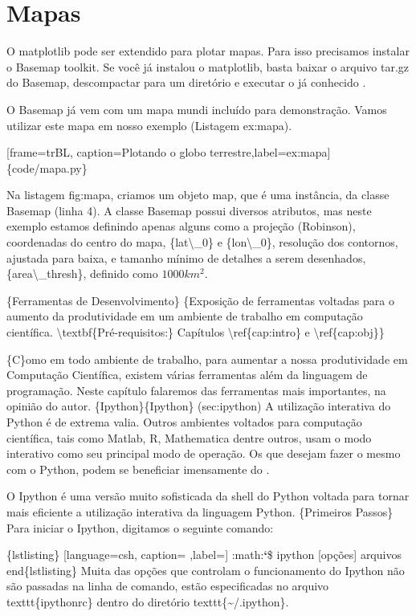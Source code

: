 \documentclass[a4paper,10pt,portuguese]{sphinxmanual}
\begin{document}
\section{Mapas}
\label{Capplot:mapas}
O matplotlib pode ser extendido para plotar mapas. Para isso
precisamos instalar o Basemap toolkit. Se você já instalou o
matplotlib, basta baixar o arquivo tar.gz do Basemap, descompactar
para um diretório e executar o já conhecido
.

O Basemap já vem com um mapa mundi incluído para demonstração.
Vamos utilizar este mapa em nosso exemplo (Listagem ex:mapa).

{[}frame=trBL, caption=Plotando o globo terrestre,label=ex:mapa{]} \{code/mapa.py\}

Na listagem fig:mapa, criamos um objeto map, que é uma instância,
da classe Basemap (linha 4). A classe Basemap possui diversos
atributos, mas neste exemplo estamos definindo apenas alguns como a
projeção (Robinson), coordenadas do centro do mapa, \{lat\textbackslash{}\_0\} e
\{lon\textbackslash{}\_0\}, resolução dos contornos, ajustada para baixa, e tamanho
mínimo de detalhes a serem desenhados, \{area\textbackslash{}\_thresh\}, definido
como $1000 km^2$.

\{Ferramentas de Desenvolvimento\}
\{Exposição de ferramentas voltadas para o aumento da produtividade em um ambiente de trabalho em computação científica. \textbackslash{}textbf\{Pré-requisitos:\} Capítulos \textbackslash{}ref\{cap:intro\} e \textbackslash{}ref\{cap:obj\}\}

\{C\}omo em todo ambiente de trabalho, para aumentar a nossa
produtividade em Computação Científica, existem várias ferramentas
além da linguagem de programação. Neste capítulo falaremos das
ferramentas mais importantes, na opinião do autor.
\{Ipython\}\{Ipython\} (sec:ipython) A utilização interativa do Python
é de extrema valia. Outros ambientes voltados para computação
científica, tais como Matlab, R, Mathematica dentre outros, usam o
modo interativo como seu principal modo de operação. Os que desejam
fazer o mesmo com o Python, podem se beneficiar imensamente do
.

O Ipython é uma versão muito sofisticada da shell do Python voltada
para tornar mais eficiente a utilização interativa da linguagem
Python. \{Primeiros Passos\} Para iniciar o Ipython, digitamos o
seguinte comando:

\{lstlisting\} {[}language=csh, caption= ,label={]}
:math:{\color{red}\bfseries{}{}`}\$ ipython {[}opções{]} arquivos
end\{lstlisting\}
Muita das opções que controlam o funcionamento do Ipython não são passadas na linha de comando, estão especificadas no arquivo texttt\{ipythonrc\} dentro do diretório texttt\{\textasciitilde{}/.ipython\}.
\end{document}
